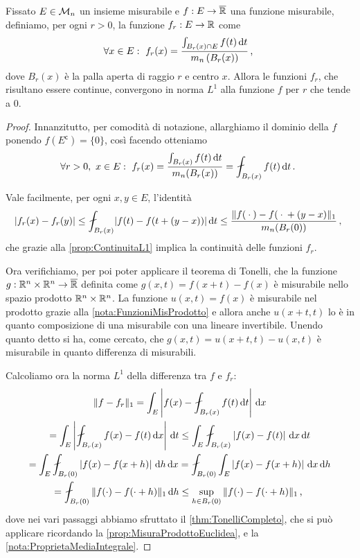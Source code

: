 \begin{lemma}\label{lemma:ContinuitaL1Palle}
	Fissato $E\in\mathcal M_n$ un insieme misurabile e $f:E\to\overline{\mathbb R}$ una funzione misurabile, definiamo, per ogni $r>0$, la funzione $f_r:E\to\mathbb R$ come
	\begin{equation*}
		\forall x\in E:\ f_r(x)=\frac{\int_{B_r(x)\cap E}f(t)\,\mathrm d t}{m_n\left(B_r(x)\right)}\, \text{, }
	\end{equation*}
	dove $B_r(x)$ è la palla aperta di raggio $r$ e centro $x$.
	Allora le funzioni $f_r$, che risultano essere continue, convergono in norma $L^1$ alla funzione $f$ per $r$ che tende a $0$.
\end{lemma}
\begin{proof}
	Innanzitutto, per comodità di notazione, allarghiamo il dominio della $f$ ponendo $f(E^{\mathsf c})=\{0\}$, così facendo otteniamo
	\begin{equation*}
		\forall r>0,\ x\in E:\ f_r(x)=\frac{\int_{B_r(x)}f(t)\de t}{m_n(B_r(x))}=\aint_{B_r(x)} f(t)\de t \punto
	\end{equation*}

	Vale facilmente, per ogni $x,y\in E$, l'identità
	\begin{equation*}
		\lvert f_r(x)-f_r(y)\rvert %
		\le \aint_{B_r(x)}\lvert f(t)-f(t+(y-x))\rvert \de t \le \frac{ \LNorm{f({}\cdot{})-f({}\cdot{}+(y-x)} }{ m_n(B_r(0)) } \virgola
	\end{equation*}
	che grazie alla \cref{prop:ContinuitaL1} implica la continuità delle funzioni $f_r$.
	
	Ora verifichiamo, per poi poter applicare il teorema di Tonelli, che la funzione $g:\mathbb R^n\times\mathbb R^n\to\overline{\mathbb R}$ definita come $g(x,t)=f(x+t)-f(x)$ è misurabile nello spazio prodotto $\mathbb R^n\times\mathbb R^n$. 
	La funzione $u(x,t)=f(x)$ è misurabile nel prodotto grazie alla \cref{nota:FunzioniMisProdotto} e allora anche $u(x+t,t)$ lo è in quanto composizione di una misurabile con una lineare invertibile. Unendo quanto detto si ha, come cercato, che $g(x,t)=u(x+t,t)-u(x,t)$ è misurabile in quanto differenza di misurabili.
	
	Calcoliamo ora la norma $L^1$ della differenza tra $f$ e $f_r$:
	\begin{multline}\label{eq:ContinuitaPalleDis}
		\LNorm{f-f_r}=\int_E \left\lvert f(x)-\aint_{B_r(x)}f(t)\de t\right\rvert\de x\\
		=\int_E\left\lvert\aint_{B_r(x)}f(x)-f(t)\de x\right\rvert\de t\le \int_E\aint_{B_r(x)}\left\lvert f(x)-f(t)\right\rvert\de x\de t\\
		=\int_E\aint_{B_r(0)}\left\lvert f(x)-f(x+h)\right\rvert\de h\de x
		=\aint_{B_r(0)}\int_E \left\lvert f(x)-f(x+h)\right\rvert\de x\de h\\
		= \aint_{B_r(0)}\LNorm{f(\cdot)-f(\cdot+h)}\de h\le \sup_{h\in B_r(0)} \LNorm{f(\cdot)-f(\cdot+h)}\virgola
	\end{multline}
	dove nei vari passaggi abbiamo sfruttato il \cref{thm:TonelliCompleto}, che si può applicare ricordando la \cref{prop:MisuraProdottoEuclidea}, e la \cref{nota:ProprietaMediaIntegrale}.
	

\end{proof}
